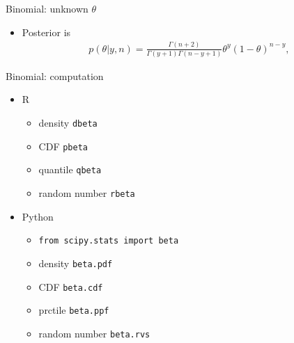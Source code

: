 \documentclass[english,t]{beamer}
\begin{document}

\begin{frame}{Binomial: unknown $\theta$}

  \begin{itemize}
  \item Posterior is
    \begin{align*}
      p(\theta|y,n) = \frac{\Gamma(n+2)}{\Gamma(y+1)\Gamma(n-y+1)}\theta^y(1-\theta)^{n-y},
    \end{align*}
  \end{itemize}
  \begin{center}
  \end{center}
\end{frame}

\begin{frame}{Binomial: computation}

  \begin{itemize}
  \item R
    \begin{itemize}
    \item density {\tt dbeta}
    \item CDF {\tt pbeta}
    \item quantile {\tt qbeta}
    \item random number {\tt rbeta}
    \end{itemize}
  \item Python
    \begin{itemize}
    \item {\tt from scipy.stats import beta}
    \item density {\tt beta.pdf}
    \item CDF {\tt beta.cdf}
    \item prctile {\tt beta.ppf}
    \item random number {\tt beta.rvs}
    \end{itemize}
  \end{itemize}

\end{frame}
\end{document}
